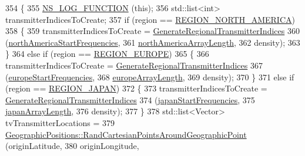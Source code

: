 \begin{DoxyCode}
354 \{
355   \hyperlink{log-macros-disabled_8h_a90b90d5bad1f39cb1b64923ea94c0761}{NS\_LOG\_FUNCTION} (\textcolor{keyword}{this});
356   std::list<int> transmitterIndicesToCreate;
357   \textcolor{keywordflow}{if} (region == \hyperlink{classns3_1_1TvSpectrumTransmitterHelper_a7b4aafcd25156458e9ec922587169bbea056d73a4fde73ff587515aba0b9f0178}{REGION\_NORTH\_AMERICA})
358     \{
359       transmitterIndicesToCreate = \hyperlink{classns3_1_1TvSpectrumTransmitterHelper_a006ecf3ca051c904ef507fbe1594b441}{GenerateRegionalTransmitterIndices} 
360                                    (\hyperlink{namespacens3_abd0dc95c8909f85e962a681d932219d3}{northAmericaStartFrequencies}, 
361                                     \hyperlink{namespacens3_a74efef1e0d1e67a89e219a39f06b881e}{northAmericaArrayLength}, 
362                                     density);
363     \}
364   \textcolor{keywordflow}{else} \textcolor{keywordflow}{if} (region == \hyperlink{classns3_1_1TvSpectrumTransmitterHelper_a7b4aafcd25156458e9ec922587169bbeaa28b9c30091d0f924883332dd748e796}{REGION\_EUROPE})
365     \{
366       transmitterIndicesToCreate = \hyperlink{classns3_1_1TvSpectrumTransmitterHelper_a006ecf3ca051c904ef507fbe1594b441}{GenerateRegionalTransmitterIndices} 
367                                    (\hyperlink{namespacens3_aa7262dcdf15461a937bb8d2afa65288c}{europeStartFrequencies}, 
368                                     \hyperlink{namespacens3_ac2219660b69e86f221be17c4f0cfac4d}{europeArrayLength}, 
369                                     density);
370     \}
371   \textcolor{keywordflow}{else} \textcolor{keywordflow}{if} (region == \hyperlink{classns3_1_1TvSpectrumTransmitterHelper_a7b4aafcd25156458e9ec922587169bbeaa08d9e0f51ad5b6a6230db87ed8b2176}{REGION\_JAPAN})
372     \{
373       transmitterIndicesToCreate = \hyperlink{classns3_1_1TvSpectrumTransmitterHelper_a006ecf3ca051c904ef507fbe1594b441}{GenerateRegionalTransmitterIndices} 
374                                    (\hyperlink{namespacens3_a88b726d85e0f1f604a83f713b8e06105}{japanStartFrequencies}, 
375                                     \hyperlink{namespacens3_a156aac120ce816da1808c0b1a6bd2a01}{japanArrayLength}, 
376                                     density);
377     \}
378   std::list<Vector> tvTransmitterLocations = 
379     \hyperlink{classns3_1_1GeographicPositions_a020b37badd7a5ccf4d32854754b261c0}{GeographicPositions::RandCartesianPointsAroundGeographicPoint}
       (originLatitude, 
380                                                                    originLongitude, 

\end{DoxyCode}
